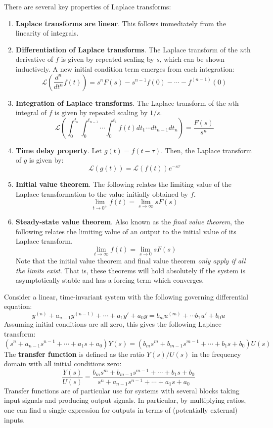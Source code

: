 \begin{framed}
    There are several key properties of Laplace transforms: \begin{enumerate}
        \item[1.] \textbf{Laplace transforms are linear}. This follows immediately from the linearity of integrals.
        \item[2.] \textbf{Differentiation of Laplace transforms}. The Laplace transform of the $n$th derivative of $f$ is given by repeated scaling by $s$, which can be shown inductively. A new initial condition term emerges from each integration: \[\mathcal{L}\left(\frac{d^n}{dt^n} f(t)\right) = s^n F(s) - s^{n-1} f(0) - \cdots - f^{(n-1)}(0)\]
        \item[3.] \textbf{Integration of Laplace transforms}. The Laplace transform of the $n$th integral of $f$ is given by repeated scaling by $1/s$. \[\mathcal{L}\left(\int_0^{t_n}\int_0^{t_{n-1}}\cdots\int _0^{t_1} f(t)dt_1 \cdots dt_{n-1}dt_n\right)=\frac{F(s)}{s^n}\]
        \item[4.] \textbf{Time delay property}. Let $g(t) = f(t-\tau)$. Then, the Laplace transform of $g$ is given by: \[\mathcal{L}(g(t)) = \mathcal{L}(f(t))e^{-s\tau}\]
        \item[5.] \textbf{Initial value theorem}. The following relates the limiting value of the Laplace transformation to the value initially obtained by $f$.\[\lim_{t\to 0^+} f(t) = \lim_{s\to\infty} s F(s)\]
        \item[6.] \textbf{Steady-state value theorem}. Also known as the \textit{final value theorem}, the following relates the limiting value of an output to the initial value of its Laplace transform. \[\lim_{t\to\infty} f(t) = \lim_{s\to 0} sF(s)\] Note that the initial value theorem and final value theorem \textit{only apply if all the limits exist}. That is, these theorems will hold absolutely if the system is asymptotically stable and has a forcing term which converges.
    \end{enumerate}
\end{framed}

Consider a linear, time-invariant system with the following governing differential equation: \[y^{(n)} + a_{n-1} y^{(n-1)} + \cdots + a_1 y' + a_0 y = b_m u^{(m)} + \cdots b_1 u' + b_0 u\] Assuming initial conditions are all zero, this gives the following Laplace transform: \[(s^n + a_{n-1} s^{n-1} + \cdots + a_1 s + a_0)Y(s) = (b_ms^m + b_{m-1} s^{m-1} + \cdots + b_1 s + b_0) U(s)\] The \textbf{transfer function} is defined as the ratio $Y(s)/U(s)$ in the frequency domain with all initial conditions zero: \[\frac{Y(s)}{U(s)} = \frac{b_m s^m + b_{m-1} s^{m-1} + \cdots + b_1 s + b_0}{s^n + a_{n-1}s^{n-1} + \cdots + a_1 s + a_0}\] Transfer functions are of particular use for systems with several blocks taking input signals and producing output signals. In particular, by multiplying ratios, one can find a single expression for outputs in terms of (potentially external) inputs.

